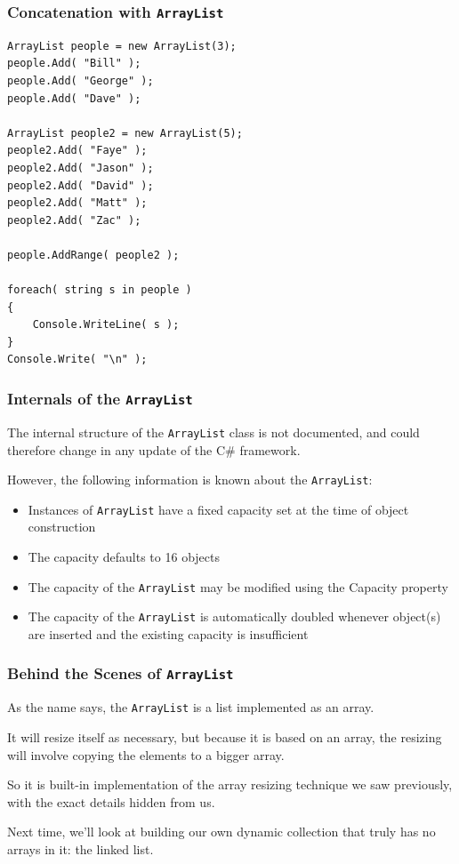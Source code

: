 \begin{frame}[fragile]
\frametitle{Concatenation with \texttt{ArrayList}}
{\scriptsize
\begin{verbatim}
ArrayList people = new ArrayList(3);
people.Add( "Bill" );
people.Add( "George" );
people.Add( "Dave" );

ArrayList people2 = new ArrayList(5);
people2.Add( "Faye" );
people2.Add( "Jason" );
people2.Add( "David" );
people2.Add( "Matt" );
people2.Add( "Zac" );

people.AddRange( people2 );

foreach( string s in people )
{
    Console.WriteLine( s );
}
Console.Write( "\n" );
\end{verbatim}
}
\end{frame}



\begin{frame}
\frametitle{Internals of the \texttt{ArrayList}}

The internal structure of the \texttt{ArrayList} class is not documented, and could therefore change in any update of the C\# framework.

However, the following information is known about the \texttt{ArrayList}:
\begin{itemize}
\item Instances of \texttt{ArrayList} have a fixed capacity set at the time of object construction
\item The capacity defaults to 16 objects
\item The capacity of the \texttt{ArrayList} may be modified using the Capacity property
\item The capacity of the \texttt{ArrayList} is automatically doubled whenever object(s) are inserted and the existing capacity is insufficient
\end{itemize}

\end{frame}

\begin{frame}
\frametitle{Behind the Scenes of \texttt{ArrayList}}
As the name says, the \texttt{ArrayList} is a list implemented as an array.

It will resize itself as necessary, but because it is based on an array, the resizing will involve copying the elements to a bigger array.

So it is built-in implementation of the array resizing technique we saw previously, with the exact details hidden from us.

Next time, we'll look at building our own dynamic collection that truly has no arrays in it: the \alert{linked list}.

\end{frame}



